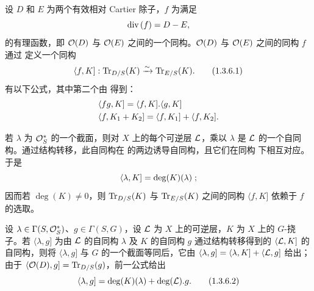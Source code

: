 \subsubsection{} 设 $D$ 和 $E$ 为两个有效相对 Cartier 除子，$f$ 为满足 $$
\text{\rm div\,}(f)=D-E{},
$$ 的有理函数，即 ${\mathcal O}(D)$ 与 ${\mathcal O}(E)$ 之间的一个同构。${\mathcal O}(D)$ 与 ${\mathcal O}(E)$ 之间的同构 $f$ 通过  定义一个同构 \begin{equation*}
\langle f,K]:\operatorname{Tr}_{D/S}(K)\xrightarrow{\sim} \operatorname{Tr}_{E/S}(K){}.\tag{1.3.6.1}
\end{equation*} 有\pageoriginale 以下公式，其中第二个由  得到： \begin{align*}
& \langle fg,K]=\langle f,K].\langle g,K]\\
& \langle f,K_{1}+K_{2}]=\langle f,K_{1}]+\langle f,K_{2}]{}.
\end{align*}

若 $\lambda$ 为 ${\mathcal O}^{\ast}_{S}$ 的一个截面，则对 $X$ 上的每个可逆层 ${\mathcal L}$，乘以 $\lambda$ 是 ${\mathcal L}$ 的一个自同构。通过结构转移，此自同构在  的两边诱导自同构，且它们在同构  下相互对应。于是 $$
\langle \lambda, K]=\deg (K)(\lambda){}\;;
$$ 因而若 $\deg(K)\neq 0$，则 $\operatorname{Tr}_{D/S}(K)$ 与 $\operatorname{Tr}_{E/S}(K)$ 之间的同构 $\langle f,K]$ 依赖于 $f$ 的选取。

设 $\lambda\in \Gamma(S,{\mathcal O}^{\ast}_{S})$、$g\in \Gamma(S,G)$，设 ${\mathcal L}$ 为 $X$ 上的可逆层，$K$ 为 $X$ 上的 $G$-挠子。若 $\langle \lambda,g]$ 为由 ${\mathcal L}$ 的自同构 $\lambda$ 及 $K$ 的自同构 $g$ 通过结构转移得到的 $\langle {\mathcal L},K]$ 的自同构，则将 $\langle \lambda,g]$ 与 $G$ 的一个截面等同后，它由 $\langle \lambda,g]=\langle \lambda,K]+\langle {\mathcal L},g]$ 给出；由于 $\langle {\mathcal O}(D),g]=\operatorname{Tr}_{D/S}(g)$，前一公式给出 \begin{equation*}
\langle \lambda,g]=\deg(K)(\lambda)+\deg({\mathcal L}).g{}.\tag{1.3.6.2}
\end{equation*}

